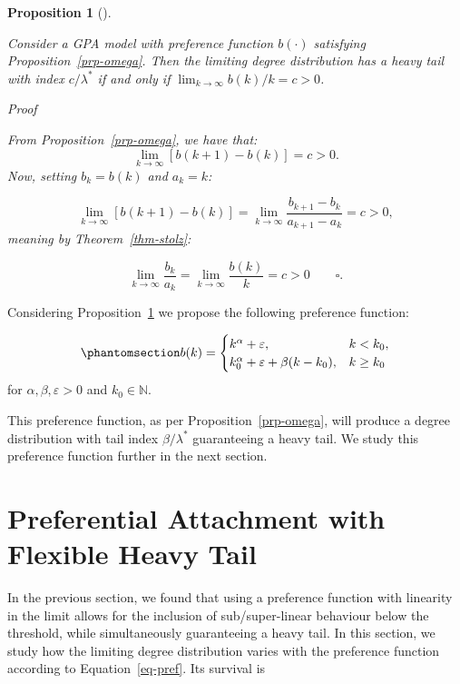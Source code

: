 \documentclass[
  sn-basic,
]{sn-jnl}
\theoremstyle{plain}
\theoremstyle{plain}
\newtheorem{proposition}{Proposition}[section]
\theoremstyle{remark}
\begin{document}
\begin{proposition}[]\protect\hypertarget{prp-omega2}{}\label{prp-omega2}

Consider a GPA model with preference function \(b(\cdot)\) satisfying
Proposition~\ref{prp-omega}. Then the limiting degree distribution has a
heavy tail with index \(c/\lambda^{*}\) if and only if
\(\lim_{k\rightarrow\infty}b(k)/k = c > 0\).

\emph{Proof}

From Proposition~\ref{prp-omega}, we have that: \[
\lim_{k\rightarrow\infty}[b(k+1)-b(k)] = c>0.
\] Now, setting \(b_k = b(k)\) and \(a_k = k\):

\[
\lim_{k\rightarrow\infty}[b(k+1)-b(k)] = \lim_{k\rightarrow\infty}\frac{b_{k+1} - b_k}{a_{k+1} - a_k} = c>0,
\] meaning by Theorem~\ref{thm-stolz}:

\[
\lim_{k\rightarrow\infty}\frac{b_k}{a_k} = \lim_{k\rightarrow\infty}\frac{b(k)}{k} = c>0\qquad \square.
\]

\end{proposition}

Considering Proposition~\ref{prp-omega2} we propose the following
preference function:

\begin{equation}\phantomsection\label{eq-pref}{
b(k) = \begin{cases}
k^\alpha + \varepsilon,&k<k_0,\\
k_0^\alpha + \varepsilon + \beta(k-k_0), &k\ge k_0
\end{cases}
}\end{equation} for \(\alpha,\beta, \varepsilon>0\) and
\(k_0\in\mathbb N\).

This preference function, as per Proposition~\ref{prp-omega}, will
produce a degree distribution with tail index \(\beta/\lambda^*\)
guaranteeing a heavy tail. We study this preference function further in
the next section.

\newpage

\section{Preferential Attachment with Flexible Heavy
Tail}\label{sec-model}

In the previous section, we found that using a preference function with
linearity in the limit allows for the inclusion of sub/super-linear
behaviour below the threshold, while simultaneously guaranteeing a heavy
tail. In this section, we study how the limiting degree distribution
varies with the preference function according to Equation~\ref{eq-pref}.
Its survival is
\end{document}

